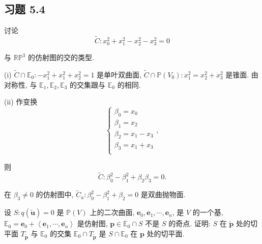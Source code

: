 \documentclass{ctexart}
\begin{document}
\subsection{习题 5.4}
\begin{exercise}%
    讨论
    \[\widetilde{C}:x_0^2+x_1^2-x_2^2-x_3^2=0\]

    与 $\mathbb{RP}^3$ 的仿射图的交的类型.
\end{exercise}
\begin{solution}
    (i) $\widetilde{C}\cap\mathbb{E}_0:-x_1^2+x_1^2+x_2^2=1$ 是单叶双曲面, $\widetilde{C}\cap\mathbb{P}(V_0):x_1^2=x_2^2+x_3^2$ 是锥面. 由对称性, 与 $\mathbb{E}_1,\mathbb{E}_2,\mathbb{E}_3$ 的交集跟与 $\mathbb{E}_0$ 的相同.

    (ii) 作变换
    \[\begin{cases}
        \beta_0=x_0 \\
        \beta_1=x_2 \\
        \beta_2=x_1-x_3 \\
        \beta_3=x_1+x_3 \\
    \end{cases},\]

    则
    \[\widetilde{C}:\beta_0^2-\beta_1^2+\beta_2\beta_3=0.\]

    在 $\beta_3\neq0$ 的仿射图中, $\widetilde{C}_a:\beta_0^2-\beta_1^2+\beta_2=0$ 是双曲抛物面.
\end{solution}
\begin{exercisec}\label{exc1}
    设 $S:q(\tilde{\boldsymbol{u}})=0$ 是 $\mathbb{P}(V)$ 上的二次曲面, $\boldsymbol{e}_0,\boldsymbol{e}_1,\cdots,\boldsymbol{e}_n$, 是 $V$ 的一个基, $\mathbb{E}_0=\boldsymbol{e}_0+\left<\boldsymbol{e}_1,\cdots,\boldsymbol{e}_n\right>$ 是仿射图, $\boldsymbol{p}\in\mathbb{E}_0\cap S$ 不是 $S$ 的奇点. 证明: $S$ 在 $\tilde{\boldsymbol{p}}$ 处的切平面 $T_{\tilde{\boldsymbol{p}}}$ 与 $\mathbb{E}_0$ 的交集 $\mathbb{E}_0\cap T_{\tilde{\boldsymbol{p}}}$ 是 $S\cap\mathbb{E}_0$ 在 $\boldsymbol{p}$ 处的切平面.
\end{exercisec}
\end{document}
